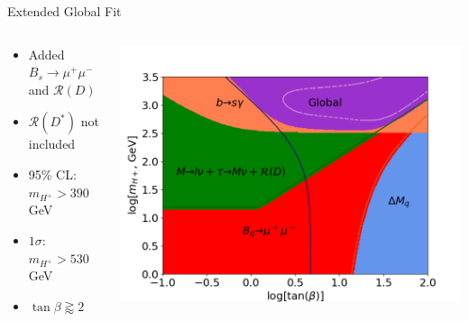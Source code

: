 \documentclass[10pt,xcolor={table,dvipsnames},t]{beamer}
\begin{document}
\begin{frame}{Extended Global Fit}
    \begin{columns}[T]
        \begin{column}{0.37\textwidth}
            \vspace{1.5em}
            \begin{itemize}
                \item Added $B_s\to\mu^+\mu^-$ and $\mathcal{R}(D)$
                \item $\mathcal{R}(D^*)$ not included
                \item 95\% CL: $m_{H^+}>390\,$GeV
                \item $1\sigma$: $m_{H^+}>530\,$GeV
                \item $\tan\beta\gtrapprox2$
            \end{itemize}
        \end{column}
        \begin{column}{0.60\textwidth}
            \includegraphics[scale=0.35]{global_lines.png}
        \end{column}
    \end{columns}
\end{frame}
\end{document}
